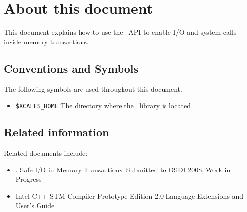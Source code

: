 \section{About this document}
This document explains how to use the \xcalls~API to enable I/O and system calls
inside memory transactions.

\subsection{Conventions and Symbols}
The following symbols are used throughout this document.
\begin{itemize}
\item \verb!$XCALLS_HOME! The directory where the \xcalls~library is located
\end{itemize}

\subsection{Related information}
Related documents include:
\begin{itemize}
\item \xcalls: Safe I/O in Memory Transactions, Submitted to OSDI 2008, 
Work in Progress
\item Intel C++ STM Compiler Prototype Edition 2.0 Language Extensions 
and User's Guide
\end{itemize}

